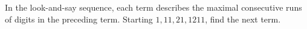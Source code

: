 In the look-and-say sequence, each term describes the maximal consecutive runs of digits in the preceding term. Starting $ 1,11,21,1211 $, find the next term.
